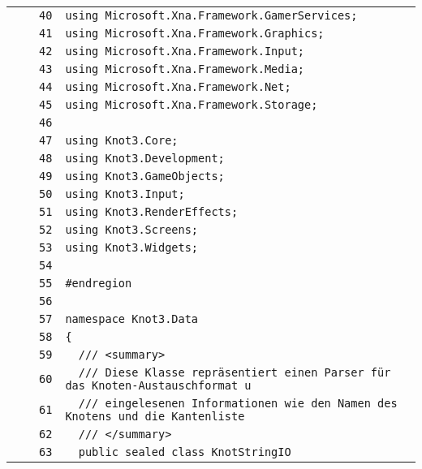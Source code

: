 \documentclass[a4paper,10pt]{article}
\begin{document}
\begin{longtable}[l]{lrrl}
\cellcolor{gray} &  & \verb~40~ & \verb~using Microsoft.Xna.Framework.GamerServices;~\\
\cellcolor{gray} &  & \verb~41~ & \verb~using Microsoft.Xna.Framework.Graphics;~\\
\cellcolor{gray} &  & \verb~42~ & \verb~using Microsoft.Xna.Framework.Input;~\\
\cellcolor{gray} &  & \verb~43~ & \verb~using Microsoft.Xna.Framework.Media;~\\
\cellcolor{gray} &  & \verb~44~ & \verb~using Microsoft.Xna.Framework.Net;~\\
\cellcolor{gray} &  & \verb~45~ & \verb~using Microsoft.Xna.Framework.Storage;~\\
\cellcolor{gray} &  & \verb~46~ & \verb~~\\
\cellcolor{gray} &  & \verb~47~ & \verb~using Knot3.Core;~\\
\cellcolor{gray} &  & \verb~48~ & \verb~using Knot3.Development;~\\
\cellcolor{gray} &  & \verb~49~ & \verb~using Knot3.GameObjects;~\\
\cellcolor{gray} &  & \verb~50~ & \verb~using Knot3.Input;~\\
\cellcolor{gray} &  & \verb~51~ & \verb~using Knot3.RenderEffects;~\\
\cellcolor{gray} &  & \verb~52~ & \verb~using Knot3.Screens;~\\
\cellcolor{gray} &  & \verb~53~ & \verb~using Knot3.Widgets;~\\
\cellcolor{gray} &  & \verb~54~ & \verb~~\\
\cellcolor{gray} &  & \verb~55~ & \verb~#endregion~\\
\cellcolor{gray} &  & \verb~56~ & \verb~~\\
\cellcolor{gray} &  & \verb~57~ & \verb~namespace Knot3.Data~\\
\cellcolor{gray} &  & \verb~58~ & \verb~{~\\
\cellcolor{gray} &  & \verb~59~ & \verb~  /// <summary>~\\
\cellcolor{gray} &  & \verb~60~ & \verb~  /// Diese Klasse repräsentiert einen Parser für das Knoten-Austauschformat u~\\
\cellcolor{gray} &  & \verb~61~ & \verb~  /// eingelesenen Informationen wie den Namen des Knotens und die Kantenliste~\\
\cellcolor{gray} &  & \verb~62~ & \verb~  /// </summary>~\\
\cellcolor{gray} &  & \verb~63~ & \verb~  public sealed class KnotStringIO~\\

\end{longtable}
\end{document}
